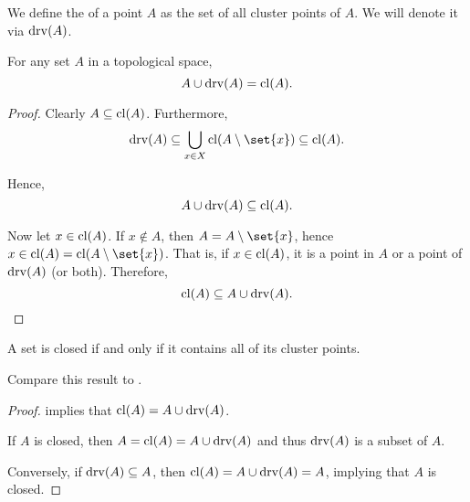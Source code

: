 \begin{definition}\label{def:derived_set}
  We define the  of a point \( A \) as the set of all cluster points of \( A \). We will denote it via \( \operatorname{drv}(A) \).
\end{definition}

\begin{proposition}\label{thm:union_with_derived_set}
  For any set \( A \) in a topological space,
  \begin{equation*}
    A \cup \operatorname{drv}(A) = \operatorname{cl}(A).
  \end{equation*}
\end{proposition}
\begin{proof}
  Clearly \( A \subseteq \operatorname{cl}(A) \). Furthermore,
  \begin{equation*}
    \drv(A) \subseteq \bigcup_{x \in X} \cl(A \setminus \set{ x }) \subseteq \cl(A).
  \end{equation*}

  Hence,
  \begin{equation*}
    A \cup \operatorname{drv}(A) \subseteq \operatorname{cl}(A).
  \end{equation*}

  Now let \( x \in \operatorname{cl}(A) \). If \( x \not\in A \), then \( A = A \setminus \set{ x } \), hence \( x \in \cl(A) = \cl(A \setminus \set{ x }) \). That is, if \( x \in \operatorname{cl}(A) \), it is a point in \( A \) or a point of \( \operatorname{drv}(A) \) (or both). Therefore,
  \begin{equation*}
    \operatorname{cl}(A) \subseteq A \cup \operatorname{drv}(A).
  \end{equation*}
\end{proof}

\begin{corollary}\label{thm:cluster_point_characterization}
  A set is closed if and only if it contains all of its cluster points.

  Compare this result to .
\end{corollary}
\begin{proof}
   implies that \( \operatorname{cl}(A) = A \cup \operatorname{drv}(A) \).

  If \( A \) is closed, then \( A = \operatorname{cl}(A) = A \cup \operatorname{drv}(A) \) and thus \( \operatorname{drv}(A) \) is a subset of \( A \).

  Conversely, if \( \operatorname{drv}(A) \subseteq A \), then \( \operatorname{cl}(A) = A \cup \operatorname{drv}(A) = A \), implying that \( A \) is closed.
\end{proof}

